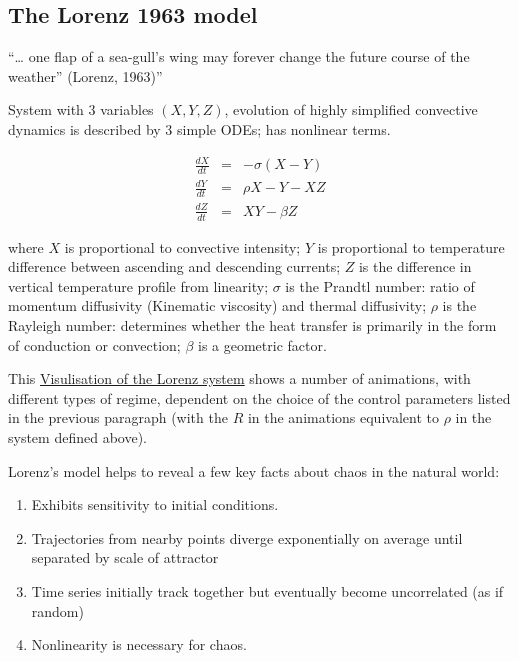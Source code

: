 	
\subsection{The Lorenz 1963 model}
``… one flap of a sea-gull’s wing may forever change the future course of the weather” (Lorenz, 1963)''
\medskip

System with 3 variables $(X, Y, Z )$, evolution of highly simplified convective dynamics is described by 3 simple ODEs; has nonlinear terms.
	
	\begin{eqnarray}
		\frac{dX}{dt} &=& - \sigma(X-Y) \nonumber \\
		\frac{dY}{dt} &=& \rho X -Y -XZ\\
		\frac{dZ}{dt} &=& XY - \beta Z \nonumber
	\end{eqnarray}
	
	where $X$ is proportional to convective intensity; $Y$ is proportional to temperature difference between ascending and descending currents; $Z$ is the difference in vertical temperature profile from linearity; $\sigma$ is the Prandtl number: ratio of momentum diffusivity (Kinematic viscosity) and thermal diffusivity; $\rho$ is the Rayleigh number: determines whether the heat transfer is primarily in the form of conduction or convection; $\beta$ is a geometric factor.

This \href{https://www.youtube.com/watch?v=CeCePH_HL0g}{Visulisation of the Lorenz system} shows a number of animations, with different types of regime, dependent on the choice of the control parameters listed in the previous paragraph (with the $R$ in the animations equivalent to $\rho$ in the system defined above).

	
	Lorenz's model helps to reveal a few key facts about chaos in the natural world:
	\begin{enumerate}
		\item Exhibits sensitivity to initial conditions.
		
		\item Trajectories from nearby points diverge exponentially on average until separated by scale of attractor
		
		\item Time series initially track together but eventually become uncorrelated (as if random) 
		
		\item Nonlinearity is necessary for chaos.
	\end{enumerate}
		
